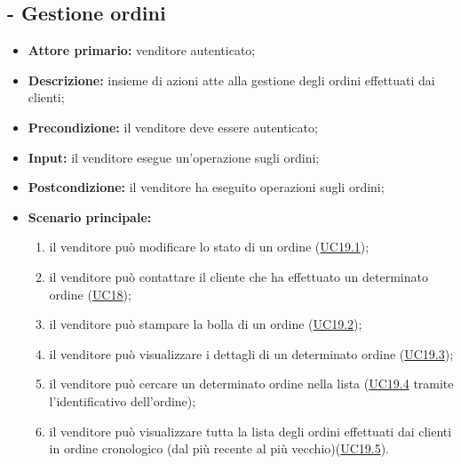 \subsection{ - Gestione ordini}
\begin{itemize}
    \item \textbf{Attore primario:} venditore autenticato;
    \item \textbf{Descrizione:} insieme di azioni atte alla gestione degli ordini effettuati dai clienti;
    \item \textbf{Precondizione:} il venditore deve essere autenticato;
    \item \textbf{Input:} il venditore esegue un'operazione sugli ordini;
    \item \textbf{Postcondizione:} il venditore ha eseguito operazioni sugli ordini;
    \item \textbf{Scenario principale:}
          \begin{enumerate}
              \item il venditore può modificare lo stato di un ordine (\hyperref[UC19.1]{UC19.1});
              \item il venditore può contattare il cliente che ha effettuato un determinato ordine (\hyperref[UC18]{UC18});
              \item il venditore può stampare la bolla di un ordine (\hyperref[UC19.2]{UC19.2});
              \item il venditore può visualizzare i dettagli di un determinato ordine (\hyperref[UC19.3]{UC19.3});
              \item il venditore può cercare un determinato ordine nella lista (\hyperref[UC19.4]{UC19.4} tramite l'identificativo dell'ordine);
              \item il venditore può visualizzare tutta la lista degli ordini effettuati dai clienti in ordine cronologico (dal più recente al più vecchio)(\hyperref[UC19.5]{UC19.5}).
            \end{enumerate}
\end{itemize}

\stepsubUserCase
